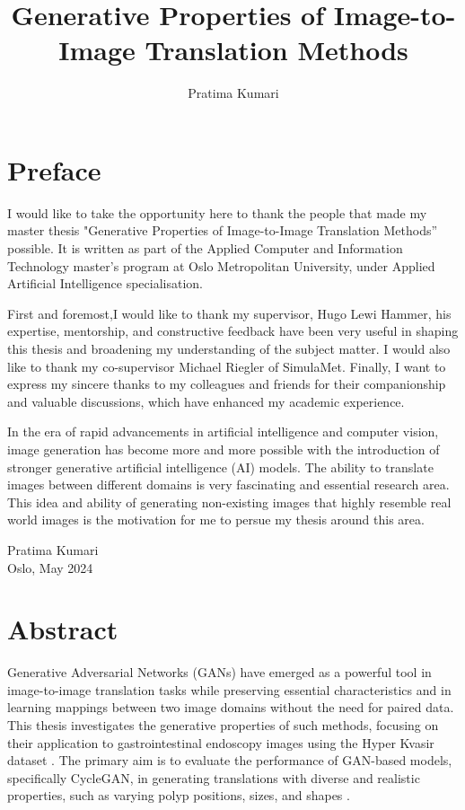 \documentclass[UKenglish,12pt]{master-style}
\title{Generative Properties of Image-to-Image Translation Methods}
\author{Pratima Kumari}
\begin{document}
\duoforside[%
    dept={Department of Computer Science},  
    program={Applied Computer and Information Technology (ACIT)},
    short%
    ]

\frontmatter 

\chapter*{Preface}

I would like to take the opportunity here to thank the people that made my master thesis "Generative Properties of Image-to-Image Translation Methods” possible. It is written as part of the Applied Computer and Information Technology master’s program at Oslo Metropolitan University, under Applied Artificial Intelligence specialisation.  

First and foremost,I would like to thank my supervisor, Hugo Lewi Hammer, his expertise, mentorship, and constructive feedback have been very useful in shaping this thesis and broadening my understanding of the subject matter. I would also like to thank my co-supervisor Michael Riegler of SimulaMet. Finally, I want to express my sincere thanks to my colleagues and friends for their companionship and valuable discussions, which have enhanced my academic experience.

In the era of rapid advancements in artificial intelligence and computer vision, image generation has become more and more possible with the introduction of stronger generative artificial intelligence (AI) models. The ability to translate images between different domains is very fascinating and essential research area. This idea and ability of generating non-existing images that highly resemble real world images is the motivation for me to persue my thesis around this area.

Pratima Kumari\\
Oslo, May 2024 


\chapter*{Abstract}

Generative Adversarial Networks (GANs) have emerged as a powerful tool in image-to-image translation tasks  while preserving essential characteristics and in learning mappings between two image domains without the need for paired data. This thesis investigates the generative properties of such methods, focusing on their application to gastrointestinal endoscopy images using the Hyper Kvasir dataset \cite{10.1007/978-3-031-45673-2}. The primary aim is to evaluate the performance of GAN-based models, specifically CycleGAN, in generating translations with diverse and realistic properties, such as varying polyp positions, sizes, and shapes .
\end{document}
